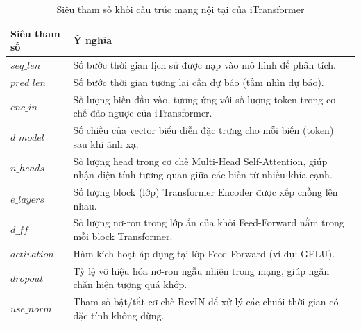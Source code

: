 \begin{table}[H]
\centering
\caption{Siêu tham số khối cấu trúc mạng nội tại của iTransformer}
\label{tab:itrans_structure}
\renewcommand{\arraystretch}{1.3}
\begin{tabular}{p{3.8cm} p{10.5cm}}
\toprule
\textbf{Siêu tham số} & \textbf{Ý nghĩa} \\
\midrule
$seq\_len$ & Số bước thời gian lịch sử được nạp vào mô hình để phân tích. \\
$pred\_len$ & Số bước thời gian tương lai cần dự báo (tầm nhìn dự báo). \\
$enc\_in$ & Số lượng biến đầu vào, tương ứng với số lượng token trong cơ chế đảo ngược của iTransformer. \\
$d\_model$ & Số chiều của vector biểu diễn đặc trưng cho mỗi biến (token) sau khi ánh xạ. \\
$n\_heads$ & Số lượng head trong cơ chế Multi-Head Self-Attention, giúp nhận diện tính tương quan giữa các biến từ nhiều khía cạnh. \\
$e\_layers$ & Số lượng block (lớp) Transformer Encoder được xếp chồng lên nhau. \\
$d\_ff$ & Số lượng nơ-ron trong lớp ẩn của khối Feed-Forward nằm trong mỗi block Transformer. \\
$activation$ & Hàm kích hoạt áp dụng tại lớp Feed-Forward (ví dụ: GELU). \\
$dropout$ & Tỷ lệ vô hiệu hóa nơ-ron ngẫu nhiên trong mạng, giúp ngăn chặn hiện tượng quá khớp. \\
$use\_norm$ & Tham số bật/tắt cơ chế RevIN để xử lý các chuỗi thời gian có đặc tính không dừng. \\
\bottomrule
\end{tabular}
\end{table}

